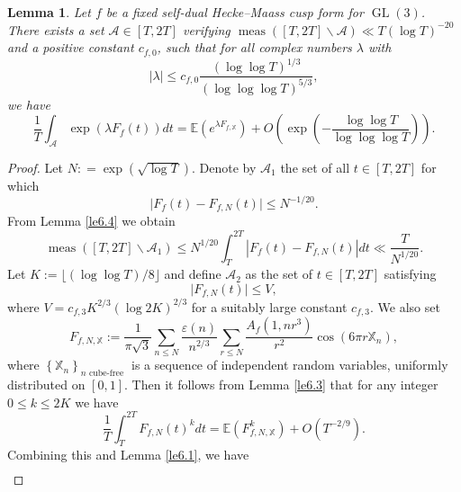 \documentclass[10pt,leqno]{amsart}
\numberwithin{equation}{section}
\newtheorem{lemma}[definition]{{Lemma}}
\begin{document}
\begin{lemma}\label{le6.5}
    Let $f$ be a fixed self-dual Hecke--Maass cusp form for $\operatorname{GL}(3)$. There exists  a set $\mathcal{A} \in[T, 2 T]$ verifying $\operatorname{meas}([T, 2 T] \backslash \mathcal{A}) \ll T(\log T)^{-20}$ and a positive constant $c_{f,0}$, such that for all complex numbers $\lambda$ with
    \[
    |\lambda| \leqslant c_{f,0}\frac{\left(\log\log T\right)^{1/3}}{\left(\log\log\log T\right)^{5/3}},
    \] 
    we have
    \[
    \frac{1}{T} \int_{\mathcal{A}} \exp (\lambda F_f(t)) d t=\mathbb{E}\left(e^{\lambda F_{f,\mathbb{X}}}\right)+O\left(\exp \left(-\frac{\log \log  T}{\log\log \log  T}\right)\right).
    \]
\end{lemma}
\begin{proof}
Let $N: = \exp(\sqrt{\log T})$. Denote by $\mathcal{A}_1$ the set of all $t \in [T, 2T]$ for which
\begin{equation}\label{eq6.4}
\bigl| F_f(t) - F_{f,N}(t) \bigr| \le N^{-1/20}.
\end{equation}
From Lemma \ref{le6.4} we obtain
\begin{equation}\label{eq6.5}
    \operatorname{meas}\left([T, 2 T] \backslash \mathcal{A}_1\right) \leq N^{1 / 20} \int_T^{2 T}\left|F_f(t)-F_{f,N}(t)\right| d t \ll \frac{T}{N^{1 / 20}}.
\end{equation}
Let $K := \bigl\lfloor (\log\log T)/8 \bigr\rfloor$ and define $\mathcal{A}_2$ as the set of $t \in [T, 2T]$ satisfying
\begin{equation}\label{eq6.6}
\bigl| F_{f,N}(t) \bigr| \le V,
\end{equation}
where $V = c_{f,3} K^{2/3}\left(\log 2K\right)^{2/3}$ for a suitably large constant $c_{f,3}$. We also set
\[
F_{f,N, \mathbb{X}}:=\frac{1}{\pi \sqrt{3}} \sum_{n \leqslant N} \frac{\varepsilon(n)}{n^{2 / 3}} \sum_{r \leqslant N} \frac{A_f\left(1,n r^3\right)}{r^{ 2}} \cos \left(6\pi r \mathbb{X}_n\right),
\]
where $\left\{\mathbb{X}_n\right\}_{n \text { cube-free }}$ is a sequence of independent random variables, uniformly distributed on $[0,1]$. Then it follows from Lemma \ref{le6.3} that for any integer $0 \leqslant k \leqslant 2 K$ we have
\begin{equation}\label{eq6.7}
    \frac{1}{T} \int_T^{2 T} F_{f,N}(t)^k d t=\mathbb{E}\left(F_{f,N, \mathbb{X}}^k\right)+O\left(T^{-2 / 9}\right).
\end{equation}
Combining this and  Lemma \ref{le6.1}, we have
\begin{equation}\label{eq6.8}
    \begin{aligned}

\end{aligned}
\end{equation}
\end{proof}
\end{document}
